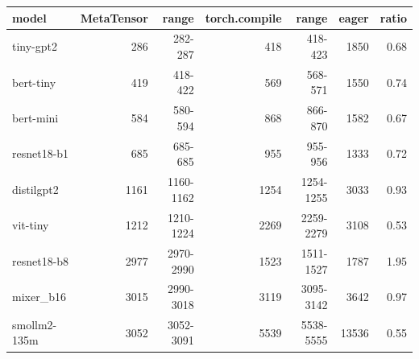\begin{tabular}{lrrrrrr}
\toprule
model & MetaTensor & range & torch.compile & range & eager & ratio \\
\midrule
tiny-gpt2 & 286 & 282-287 & 418 & 418-423 & 1850 & 0.68 \\
bert-tiny & 419 & 418-422 & 569 & 568-571 & 1550 & 0.74 \\
bert-mini & 584 & 580-594 & 868 & 866-870 & 1582 & 0.67 \\
resnet18-b1 & 685 & 685-685 & 955 & 955-956 & 1333 & 0.72 \\
distilgpt2 & 1161 & 1160-1162 & 1254 & 1254-1255 & 3033 & 0.93 \\
vit-tiny & 1212 & 1210-1224 & 2269 & 2259-2279 & 3108 & 0.53 \\
resnet18-b8 & 2977 & 2970-2990 & 1523 & 1511-1527 & 1787 & 1.95 \\
mixer\_b16 & 3015 & 2990-3018 & 3119 & 3095-3142 & 3642 & 0.97 \\
smollm2-135m & 3052 & 3052-3091 & 5539 & 5538-5555 & 13536 & 0.55 \\
\bottomrule
\end{tabular}
